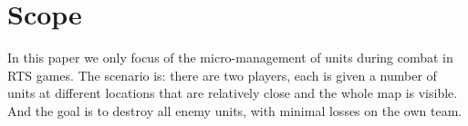 \section{Scope}
In this paper we only focus of the micro-management of units during combat in RTS games.
The scenario is: there are two players, each is given a number of units at different locations that are relatively close and the whole map is visible. And the goal is to destroy all enemy units, with minimal losses on the own team.


